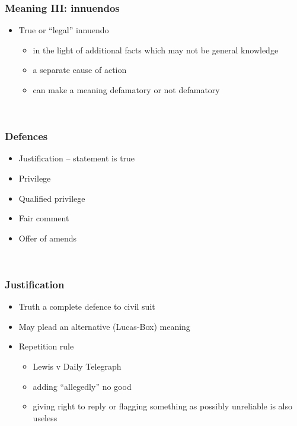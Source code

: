 \documentclass[ignorenonframetext,]{beamer}
\begin{document}
\begin{frame}
\frametitle{Meaning III: innuendos}

\begin{itemize}
\item  True or ``legal'' innuendo

  \begin{itemize}
  \item    in the light of additional facts which may not be general
    knowledge
  \item    a separate cause of action
  \item    can make a meaning defamatory or not defamatory
  \end{itemize}
\end{itemize}

~


\end{frame}

\begin{frame}
\frametitle{Defences}

\begin{itemize}
\item  Justification -- statement is true
\item  Privilege
\item  Qualified privilege
\item  Fair comment
\item  Offer of amends
\end{itemize}

~


\end{frame}

\begin{frame}
\frametitle{Justification}

\begin{itemize}
\item  Truth a complete defence to civil suit
\item  May plead an alternative ({Lucas-Box}{) meaning}
\item  Repetition rule

  \begin{itemize}
  \item    Lewis v Daily Telegraph
  \item    adding ``allegedly'' no good
  \item    giving right to reply or flagging something as possibly
    unreliable is also useless
  \end{itemize}
\end{itemize}

~


\end{frame}
\end{document}

